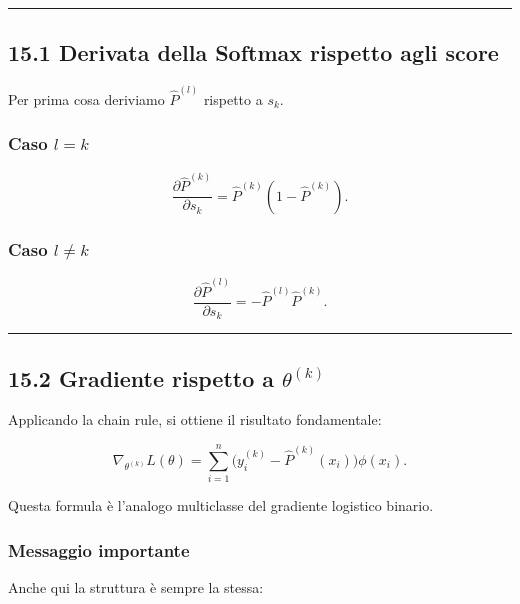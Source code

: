 \documentclass[
]{article}
\begin{document}
\begin{center}\rule{0.5\linewidth}{0.5pt}\end{center}

\subsection{15.1 Derivata della Softmax rispetto agli
score}\label{derivata-della-softmax-rispetto-agli-score}

Per prima cosa deriviamo \(\hat P^{(l)}\) rispetto a \(s_k\).

\subsubsection{\texorpdfstring{Caso \(l=k\)}{Caso l=k}}\label{caso-lk}

\[
\frac{\partial \hat P^{(k)}}{\partial s_k}
=
\hat P^{(k)}(1-\hat P^{(k)}).
\]

\subsubsection{\texorpdfstring{Caso
\(l\neq k\)}{Caso l\textbackslash neq k}}\label{caso-lneq-k}

\[
\frac{\partial \hat P^{(l)}}{\partial s_k}
=
-\hat P^{(l)}\hat P^{(k)}.
\]

\begin{center}\rule{0.5\linewidth}{0.5pt}\end{center}

\subsection{\texorpdfstring{15.2 Gradiente rispetto a
\(\theta^{(k)}\)}{15.2 Gradiente rispetto a \textbackslash theta\^{}\{(k)\}}}\label{gradiente-rispetto-a-thetak}

Applicando la chain rule, si ottiene il risultato fondamentale:

\[
\nabla_{\theta^{(k)}} L(\theta)
=
\sum_{i=1}^n \big(y_i^{(k)}-\hat P^{(k)}(x_i)\big)\phi(x_i).
\]

Questa formula è l'analogo multiclasse del gradiente logistico binario.

\subsubsection{Messaggio importante}\label{messaggio-importante}

Anche qui la struttura è sempre la stessa:
\end{document}
